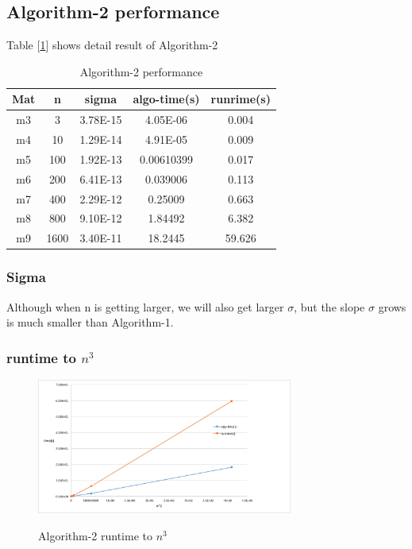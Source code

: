 \documentclass{article}
\begin{document}
\subsection{Algorithm-2 performance}
Table [\ref{tab:algo2}] shows detail result of Algorithm-2
\begin{table}[h]
    \centering
    \caption{Algorithm-2 performance}
    \begin{tabular}{|c|c|c|c|c|}
        \hline
        Mat & \multicolumn{1}{c|}{n} & \multicolumn{1}{c|}{sigma} & \multicolumn{1}{c|}{algo-time(s)} & \multicolumn{1}{c|}{runrime(s)} \bigstrut\\
        \hline
        m3  & 3   & 3.78E-15 & 4.05E-06 & 0.004 \bigstrut\\
        \hline
        m4  & 10  & 1.29E-14 & 4.91E-05 & 0.009 \bigstrut\\
        \hline
        m5  & 100 & 1.92E-13 & 0.00610399 & 0.017 \bigstrut\\
        \hline
        m6  & 200 & 6.41E-13 & 0.039006 & 0.113 \bigstrut\\
        \hline
        m7  & 400 & 2.29E-12 & 0.25009 & 0.663 \bigstrut\\
        \hline
        m8  & 800 & 9.10E-12 & 1.84492 & 6.382 \bigstrut\\
        \hline
        m9  & 1600 & 3.40E-11 & 18.2445 & 59.626 \bigstrut\\
        \hline
    \end{tabular}%

    \label{tab:algo2}
\end{table}%
\subsubsection{Sigma}
Although when n is getting larger, we will also get larger $\sigma$, but the slope $\sigma$ grows is much smaller than Algorithm-1.
\subsubsection{runtime to $n^3$}
\begin{figure}[H]
    \centering
    \caption{Algorithm-2 runtime to $n^3$}
    \includegraphics[width=0.75\textwidth]{src/algo2-runtime.png}
    \label{fig:algo2-runtime}
\end{figure}
\end{document}
